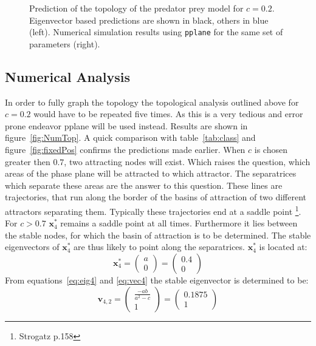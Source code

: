 \begin{figure}
\centering


\caption{Prediction of the topology of the predator prey model for $c = 0.2$. Eigenvector based predictions are shown in black, others in blue (left). Numerical simulation results using \texttt{pplane} for the same set of parameters (right).}
\label{fig:Top}
\end{figure}

\subsection{Numerical Analysis}
In order to fully graph the topology the topological analysis outlined above for $c = 0.2$ would have to be repeated five times. As this is a very tedious and error prone endeavor pplane will be used instead. Results are shown in figure~\ref{fig:NumTop}. A quick comparison with table~\ref{tab:class} and figure~\ref{fig:fixedPos} confirms the predictions made earlier. When $c$ is chosen greater then $0.7$, two attracting nodes will exist. Which raises the question, which areas of the phase plane will be attracted to which attractor. The separatrices which separate these areas are the answer to this question. These lines are trajectories, that run along the border of the basins of attraction of two different attractors separating them. Typically these trajectories end at a saddle point \footnote{Strogatz p.158}. For $c > 0.7$ $\mathbf{x}_4^*$ remains a saddle point at all times. Furthermore it lies between the stable nodes, for which the basin of attraction is to be determined. The stable eigenvectors of $\mathbf{x}_4^*$ are thus likely to point along the separatrices. $\mathbf{x}_4^*$ is located at:
\begin{equation}
\mathbf{x}_4^* = \begin{pmatrix} a \\ 0
\end{pmatrix} = \begin{pmatrix} 0.4 \\ 0
\end{pmatrix}
\end{equation}
From equations~\ref{eq:eig4} and \ref{eq:vec4} the stable eigenvector is determined to be:
\begin{equation}
\mathbf{v}_{4,2} = \begin{pmatrix}
\frac{-ab}{a^2-c} \\ 1
\end{pmatrix} 
= \begin{pmatrix}
0.1875 \\ 1
\end{pmatrix} 
\end{equation}
